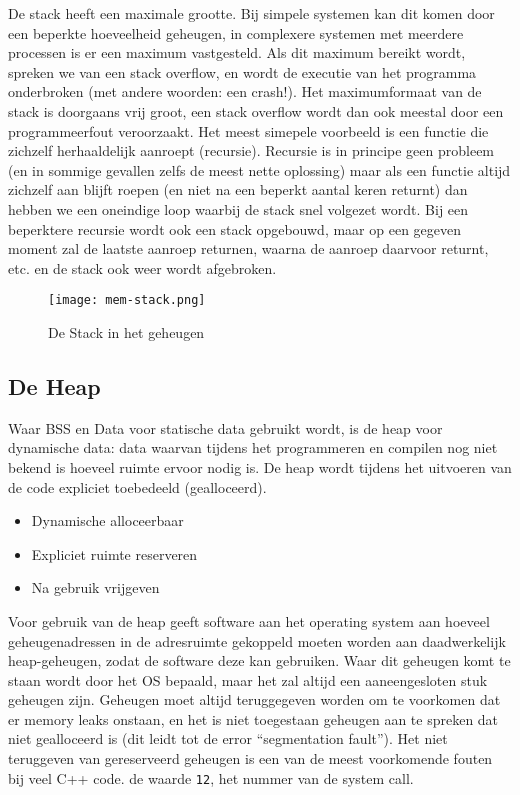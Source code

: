 De stack heeft een maximale grootte. Bij simpele systemen kan dit komen door een beperkte hoeveelheid geheugen, in complexere systemen met meerdere processen is er een maximum vastgesteld. Als dit maximum bereikt wordt, spreken we van een stack overflow, en wordt de executie van het programma onderbroken (met andere woorden: een crash!). Het maximumformaat van de stack is doorgaans vrij groot, een stack overflow wordt dan ook meestal door een programmeerfout veroorzaakt. Het meest simepele voorbeeld is een functie die zichzelf herhaaldelijk aanroept (recursie). Recursie is in principe geen probleem (en in sommige gevallen zelfs de meest nette oplossing) maar als een functie altijd zichzelf aan blijft roepen (en niet na een beperkt aantal keren returnt) dan hebben we een oneindige loop waarbij de stack snel volgezet wordt. Bij een beperktere recursie wordt ook een stack opgebouwd, maar op een gegeven moment zal de laatste aanroep returnen, waarna de aanroep daarvoor returnt, etc. en de stack ook weer wordt afgebroken.

\begin{figure}[ht]
    \centering
    \texttt{[image: mem-stack.png]}
    \caption{De Stack in het geheugen}
    \label{fig:stack}
\end{figure}

\subsection{De Heap}\label{de-heap}

Waar BSS en Data voor statische data gebruikt wordt, is de heap voor dynamische data: data waarvan tijdens het programmeren en compilen nog niet bekend is hoeveel ruimte ervoor nodig is. De heap wordt tijdens het uitvoeren van de code expliciet toebedeeld (gealloceerd).

\begin{itemize}
\item Dynamische alloceerbaar
\item Expliciet ruimte reserveren
\item Na gebruik vrijgeven
\end{itemize}

Voor gebruik van de heap geeft software aan het operating system aan hoeveel geheugenadressen in de adresruimte gekoppeld moeten worden aan daadwerkelijk heap-geheugen, zodat de software deze kan gebruiken. Waar dit geheugen komt te staan wordt door het OS bepaald, maar het zal altijd een aaneengesloten stuk geheugen zijn. Geheugen moet altijd teruggegeven worden om te voorkomen dat er memory leaks onstaan, en het is niet toegestaan geheugen aan te spreken dat niet gealloceerd is (dit leidt tot de error ``segmentation fault''). Het niet teruggeven van gereserveerd geheugen is een van de meest voorkomende fouten bij veel C++ code. de waarde \texttt{12}, het nummer van de system call.


